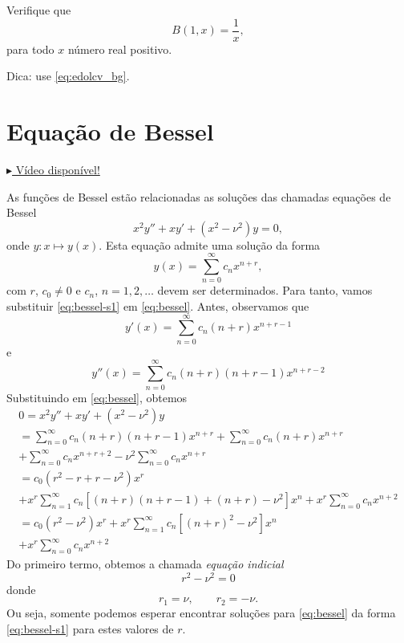 \begin{exer}
  Verifique que
  \begin{equation}
    B(1,x) = \frac{1}{x},
  \end{equation}
  para todo $x$ número real positivo.
\end{exer}
\begin{resp}
  Dica: use \eqref{eq:edolcv_bg}.
\end{resp}

\section{Equação de Bessel}\label{cap_edolcv_sec_fbessel}

\begin{flushright}
  \href{https://archive.org/details/edo-bessel}{$\blacktriangleright$ Vídeo disponível!}
\end{flushright}

As funções de Bessel estão relacionadas as soluções das chamadas equações de Bessel
\begin{equation}\label{eq:bessel}
  x^2y'' + xy' + (x^2-\nu^2)y = 0,
\end{equation}
onde $y:x\mapsto y(x)$. Esta equação admite uma solução da forma
\begin{equation}\label{eq:bessel-s1}
  y(x) = \sum_{n=0}^\infty c_nx^{n+r},
\end{equation}
com $r$, $c_0\neq 0$ e $c_n$, $n=1,2,\ldots$ devem ser determinados. Para tanto, vamos substituir \eqref{eq:bessel-s1} em \eqref{eq:bessel}. Antes, observamos que
\begin{equation}
  y'(x) = \sum_{n=0}^\infty c_n(n+r)x^{n+r-1}
\end{equation}
e
\begin{equation}
  y''(x) = \sum_{n=0}^\infty c_n(n+r)(n+r-1)x^{n+r-2}
\end{equation}
Substituindo em \eqref{eq:bessel}, obtemos
\begin{gather}
  0 = x^2y'' + xy' + (x^2-\nu^2)y \\
  = \sum_{n=0}^\infty c_n(n+r)(n+r-1)x^{n+r} + \sum_{n=0}^\infty c_n(n+r)x^{n+r} \\
  + \sum_{n=0}^\infty c_nx^{n+r+2}- \nu^2\sum_{n=0}^\infty c_nx^{n+r}\\
  = c_0(r^2-r+r-\nu^2)x^r \\                              + x^r\sum_{n=1}^\infty c_n\left[(n+r)(n+r-1)+(n+r)-\nu^2\right]x^n+ x^r\sum_{n=0}^\infty c_nx^{n+2}\\
  = c_0(r^2-\nu^2)x^r + x^r\sum_{n=1}^\infty c_n\left[(n+r)^2-\nu^2\right]x^n \\
  + x^r\sum_{n=0}^\infty c_nx^{n+2}\label{eq:bessel-s2}
\end{gather}
Do primeiro termo, obtemos a chamada \emph{equação indicial}
\begin{equation}
  r^2 - \nu^2 = 0
\end{equation}
donde
\begin{equation}
  r_1 = \nu,\qquad r_2=-\nu.
\end{equation}
Ou seja, somente podemos esperar encontrar soluções para \eqref{eq:bessel} da forma \eqref{eq:bessel-s1} para estes valores de $r$.

